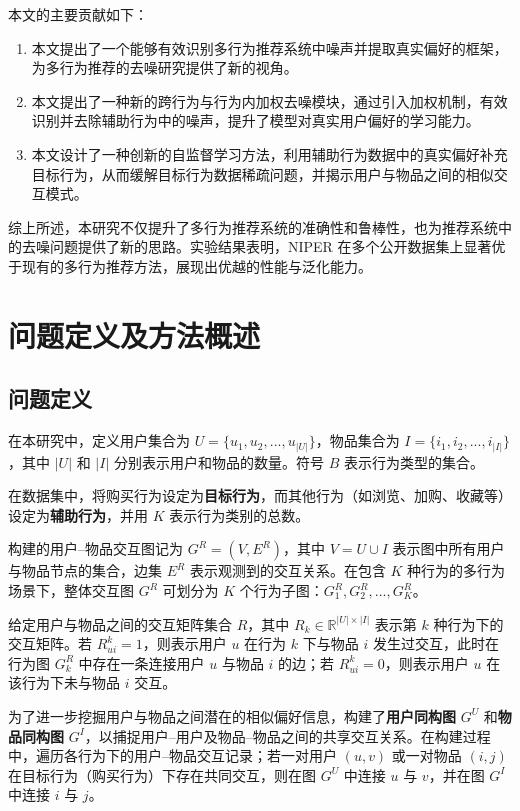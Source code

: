 本文的主要贡献如下：

\begin{enumerate}
    \item 本文提出了一个能够有效识别多行为推荐系统中噪声并提取真实偏好的框架，为多行为推荐的去噪研究提供了新的视角。
    \item 本文提出了一种新的跨行为与行为内加权去噪模块，通过引入加权机制，有效识别并去除辅助行为中的噪声，提升了模型对真实用户偏好的学习能力。
    \item 本文设计了一种创新的自监督学习方法，利用辅助行为数据中的真实偏好补充目标行为，从而缓解目标行为数据稀疏问题，并揭示用户与物品之间的相似交互模式。
\end{enumerate}

综上所述，本研究不仅提升了多行为推荐系统的准确性和鲁棒性，也为推荐系统中的去噪问题提供了新的思路。实验结果表明，NIPER 在多个公开数据集上显著优于现有的多行为推荐方法，展现出优越的性能与泛化能力。

\section{问题定义及方法概述}

\subsection{问题定义}

在本研究中，定义用户集合为 $ U = \{u_1, u_2, ..., u_{|U|}\} $，物品集合为 $ I = \{i_1, i_2, ..., i_{|I|}\} $，其中 $ |U| $ 和 $ |I| $ 分别表示用户和物品的数量。符号 $ B $ 表示行为类型的集合。  

在数据集中，将购买行为设定为\textbf{目标行为}，而其他行为（如浏览、加购、收藏等）设定为\textbf{辅助行为}，并用 $ K $ 表示行为类别的总数。  

构建的用户–物品交互图记为 $ G^R = (V, E^R) $，其中 $ V = U \cup I $ 表示图中所有用户与物品节点的集合，边集 $ E^R $ 表示观测到的交互关系。在包含 $ K $ 种行为的多行为场景下，整体交互图 $ G^R $ 可划分为 $ K $ 个行为子图：$ G^R_1, G^R_2, ..., G^R_K $。  

给定用户与物品之间的交互矩阵集合 $ R $，其中 $ R_k \in \mathbb{R}^{|U| \times |I|} $ 表示第 $ k $ 种行为下的交互矩阵。若 $ R^k_{ui} = 1 $，则表示用户 $ u $ 在行为 $ k $ 下与物品 $ i $ 发生过交互，此时在行为图 $ G^R_k $ 中存在一条连接用户 $ u $ 与物品 $ i $ 的边；若 $ R^k_{ui} = 0 $，则表示用户 $ u $ 在该行为下未与物品 $ i $ 交互。  

为了进一步挖掘用户与物品之间潜在的相似偏好信息，构建了\textbf{用户同构图} $ G^U $ 和\textbf{物品同构图} $ G^I $，以捕捉用户–用户及物品–物品之间的共享交互关系。在构建过程中，遍历各行为下的用户–物品交互记录；若一对用户 $ (u, v) $ 或一对物品 $ (i, j) $ 在目标行为（购买行为）下存在共同交互，则在图 $ G^U $ 中连接 $ u $ 与 $ v $，并在图 $ G^I $ 中连接 $ i $ 与 $ j $。  

